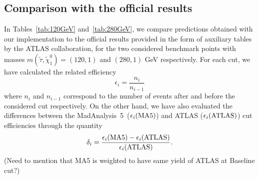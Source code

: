 \documentclass{ws-mpla}
\newcommand{\madanalysis}{{\sc MadAnalysis~5}}
\begin{document}
\subsection{Comparison with the official results}
In Tables~\ref{tab:120GeV} and~\ref{tab:280GeV}, we compare predictions obtained with our implementation to the official results provided in the form of auxiliary tables by the ATLAS collaboration, for the two considered benchmark points with masses $m(\tilde{\tau},\tilde{\chi}^0_1)=(120,1)$ and $(280,1)$ GeV respectively.
For each cut, we have calculated the related efficiency
\begin{equation}
\epsilon_i =\frac{n_i}{n_{i-1}}
\end{equation}
where $ n_i $ and $ n_{i-1} $ correspond to the number of events after and before the considered cut respectively.
%
On the other hand, we have also evaluated the differences between the \madanalysis\ ($\epsilon_i ({\rm MA5})$) and ATLAS ($\epsilon_i ({\rm ATLAS})$) cut efficiencies through the quantity
\begin{equation}
\delta_i = \frac{\epsilon_i ({\rm MA5})-\epsilon_i ({\rm ATLAS})}{\epsilon_i ({\rm ATLAS})}.
\end{equation}
{\color{blue}(Need to mention that MA5 is weighted to have same yield of ATLAS at Baseline cut?)}
\end{document}
